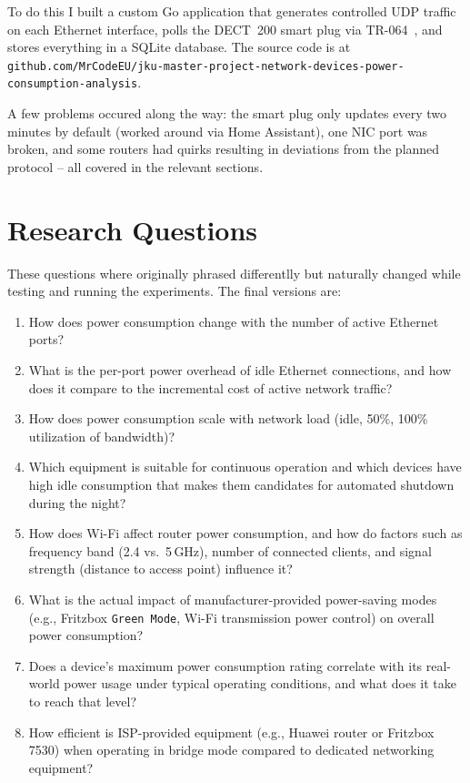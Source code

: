 \documentclass[a4paper,oneside,10pt,ngerman,english]{scrartcl}
\begin{document}
To do this I built a custom Go application that generates controlled \ac{UDP} traffic on each Ethernet interface, polls the \ac{DECT}~200 smart plug via TR-064~\cite{bib:tr064}, and stores everything in a SQLite database. The source code is at \verb|github.com/MrCodeEU/jku-master-project-network-devices-power-consumption-analysis|. 

A few problems occured along the way: the smart plug only updates every two minutes by default (worked around via Home Assistant), one \ac{NIC} port was broken, and some routers had quirks resulting in deviations from the planned protocol -- all covered in the relevant sections.


\section{Research Questions}
\label{sec:research-questions}
These questions where originally phrased differentlly but naturally changed while testing and running the experiments. The final versions are:
\begin{enumerate}
    \item[\textbf{RQ1}] How does power consumption change with the number of active Ethernet ports?
    \label{rq:ports}
    \item[\textbf{RQ2}] What is the per-port power overhead of idle Ethernet connections, and how does it compare to the incremental cost of active network traffic?
    \label{rq:port-overhead}
    \item[\textbf{RQ3}] How does power consumption scale with network load (idle, 50\%, 100\% utilization of bandwidth)?
    \label{rq:load-scaling}
    \item[\textbf{RQ4}] Which equipment is suitable for continuous operation and which devices have high idle consumption that makes them candidates for automated shutdown during the night?
    \label{rq:idle-suitability}
    \item[\textbf{RQ5}] How does Wi-Fi affect router power consumption, and how do factors such as frequency band (2.4 vs.\ 5\,GHz), number of connected clients, and signal strength (distance to access point) influence it?
    \label{rq:wifi-impact}
    \item[\textbf{RQ6}] What is the actual impact of manufacturer-provided power-saving modes (e.g., Fritzbox \verb|Green Mode|, Wi-Fi transmission power control) on overall power consumption?
    \label{rq:power-saving}
    \item[\textbf{RQ7}] Does a device's maximum power consumption rating correlate with its real-world power usage under typical operating conditions, and what does it take to reach that level?
    \label{rq:rated-vs-real}
    \item[\textbf{RQ8}] How efficient is \ac{ISP}-provided equipment (e.g., Huawei router or Fritzbox 7530) when operating in bridge mode compared to dedicated networking equipment?
    \label{rq:bridge-mode}
\end{enumerate}
\end{document}
